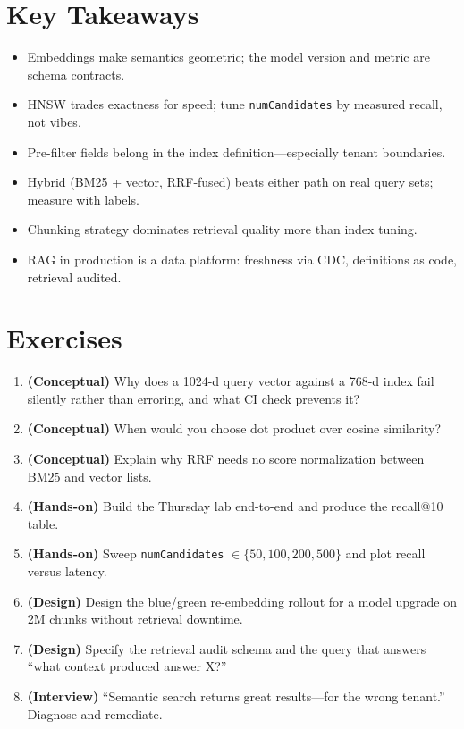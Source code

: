 \section*{Key Takeaways}
\begin{itemize}
    \item Embeddings make semantics geometric; the model version and metric are schema contracts.
    \item HNSW trades exactness for speed; tune \texttt{numCandidates} by measured recall, not vibes.
    \item Pre-filter fields belong in the index definition---especially tenant boundaries.
    \item Hybrid (BM25 + vector, RRF-fused) beats either path on real query sets; measure with labels.
    \item Chunking strategy dominates retrieval quality more than index tuning.
    \item RAG in production is a data platform: freshness via CDC, definitions as code, retrieval audited.
\end{itemize}

\section{Exercises}
\begin{enumerate}
    \item \textbf{(Conceptual)} Why does a 1024-d query vector against a 768-d index fail silently rather than erroring, and what CI check prevents it?
    \item \textbf{(Conceptual)} When would you choose dot product over cosine similarity?
    \item \textbf{(Conceptual)} Explain why RRF needs no score normalization between BM25 and vector lists.
    \item \textbf{(Hands-on)} Build the Thursday lab end-to-end and produce the recall@10 table.
    \item \textbf{(Hands-on)} Sweep \texttt{numCandidates} $\in \{50, 100, 200, 500\}$ and plot recall versus latency.
    \item \textbf{(Design)} Design the blue/green re-embedding rollout for a model upgrade on 2M chunks without retrieval downtime.
    \item \textbf{(Design)} Specify the retrieval audit schema and the query that answers ``what context produced answer X?''
    \item \textbf{(Interview)} ``Semantic search returns great results---for the wrong tenant.'' Diagnose and remediate.
\end{enumerate}

